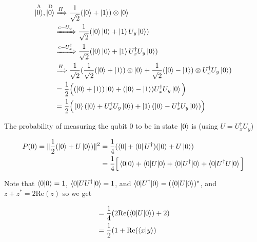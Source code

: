 \documentclass[11pt]{article}
\newcommand{\invsq}{\frac{1}{\sqrt{2}}}
\begin{document}
\begin{enumerate}
\begin{enumerate}
		            \begin{align*}
			            \overset{\text{A}}{\ket{0}}, \overset{\text{D}}{\ket{0}} & \xRightarrow{H} \invsq (\ket{0} + \ket{1}) \otimes \ket{0}                                                                         \\
			                                                                     & \xRightarrow{c-U_y} \invsq (\ket{0} \ket{0} + \ket{1} U_y \ket{0})                                                                 \\
			                                                                     & \xRightarrow{c-U_x^{\dagger}} \invsq (\ket{0} \ket{0} + \ket{1} U_x^{\dagger} U_y \ket{0})                                         \\
			                                                                     & \xRightarrow{H} \invsq (\invsq (\ket{0} + \ket{1}) \otimes \ket{0} + \invsq (\ket{0} - \ket{1}) \otimes U^{\dagger}_x U_y \ket{0}) \\
			                                                                     & = \frac12 \Big((\ket{0} + \ket{1}) \ket{0} + (\ket{0} - \ket{1}) U^{\dagger}_x U_y \ket{0} \Big)                                   \\
			                                                                     & = \frac12 \Big( \ket{0} (\ket{0} + U^{\dagger}_x U_y \ket{0}) + \ket{1} (\ket{0} - U^{\dagger}_x U_y \ket{0}) \Big)
		            \end{align*}

		            The probability of measuring the qubit 0 to be in state $\ket{0}$ is (using $U = U_x^\dagger U_y$)

		            \begin{align*}
			            P(0)  = \| \frac12 (\ket{0} + U \ket{0}) \|^2 & = \frac14 (\bra{0} + \bra{0} U^\dagger) (\ket{0} + U \ket{0})                                                 \\
			                                                          & = \frac14 \Big[ \braket{0|0} + \braket{0|U| 0} + \braket{0 | U^{\dagger}| 0} + \braket{0|U^\dagger U|0} \Big]
		            \end{align*}

		            Note that $\braket{0|0} = 1$, $\braket{0 | UU^\dagger| 0} = 1$, and $\braket{0 | U^\dagger | 0} = (\braket{0 | U |0})^*$, and $z + z^* = 2 \text{Re}(z)$ so we get

		            \begin{align*}
			             & = \frac14 (2 \text{Re}(\braket{0 | U | 0}) + 2) \\
			             & = \frac12 (1 + \text{Re}(\braket{x|y})
		            \end{align*}


\end{enumerate}
\end{enumerate}
\end{document}

